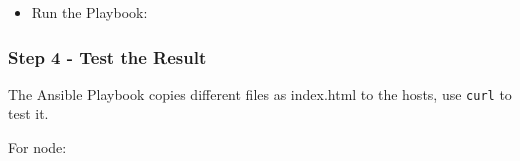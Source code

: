 \begin{Shaded}
\begin{Highlighting}[]
\PreprocessorTok{{-}{-}{-}}
\KeywordTok{{-}}\AttributeTok{ }\KeywordTok{:}
\AttributeTok{  }\KeywordTok{:}
\AttributeTok{  }\KeywordTok{:}\AttributeTok{ }
\AttributeTok{  }\KeywordTok{:}
\AttributeTok{    }\KeywordTok{{-}}\AttributeTok{ }\KeywordTok{:}
\AttributeTok{      }\KeywordTok{:}
\AttributeTok{        }\KeywordTok{:}\AttributeTok{ }
\AttributeTok{        }\KeywordTok{:}
\end{Highlighting}
\end{Shaded}

\begin{itemize}
\tightlist
\item
  Run the Playbook:
\end{itemize}

\begin{Shaded}
\begin{Highlighting}[]
\ExtensionTok{[student@controller}\NormalTok{ ansible{-}files]$ ansible{-}navigator run deploy\_index\_html.yml}
\end{Highlighting}
\end{Shaded}

\hypertarget{step-4---test-the-result}{%
\subsubsection{Step 4 - Test the
Result}\label{step-4---test-the-result}}

The Ansible Playbook copies different files as index.html to the hosts,
use \texttt{curl} to test it.

For node:

\begin{Shaded}
\begin{Highlighting}[]
\ExtensionTok{[student@controller}\NormalTok{ ansible{-}files]$ curl http://[10.3.48.[100+PARTICIPANT\_ID]}
\OperatorTok{\textless{}}\OperatorTok{\textgreater{}}
\OperatorTok{  \textless{}}\OperatorTok{\textgreater{}}\OperatorTok{\textless{}}\OperatorTok{\textgreater{}}
\OperatorTok{\textless{}}\OperatorTok{\textgreater{}}
\end{Highlighting}
\end{Shaded}

